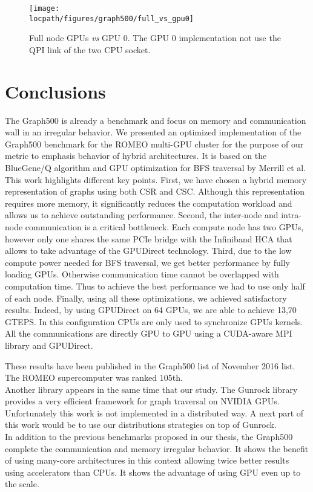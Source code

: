\begin{figure}[!t]
\centering
\texttt{[image: \\locpath/figures/graph500/full\_vs\_gpu0]}
\caption[]{Full node GPUs \textit{vs} GPU 0. The GPU 0 implementation not use the QPI link of the two CPU socket.}
\label{fig:full_vs_gpu0}
\end{figure}

\section{Conclusions}

The Graph500 is already a benchmark and focus on memory and communication wall in an irregular behavior.
We presented an optimized implementation of the Graph500 benchmark for the ROMEO  multi-GPU cluster for the purpose of our metric to emphasis behavior of hybrid architectures.
It is based on the BlueGene/Q algorithm and GPU optimization for BFS traversal by Merrill et al. 
This work highlights different key points.
First, we have chosen a hybrid memory representation of graphs using both CSR and CSC. 
Although this representation requires more memory, it significantly reduces  the computation workload and allows us to achieve outstanding performance.
Second, the inter-node and intra-node communication is a critical bottleneck. 
Each compute node has two GPUs, however only one shares the same PCIe bridge with the Infiniband HCA that allows to take advantage of the GPUDirect technology.
Third, due to the low compute power needed for BFS traversal, we get better performance by fully loading GPUs.
Otherwise communication time cannot be overlapped with computation time. 
Thus to achieve the best performance we had to use only half of each node.
Finally, using all these optimizations, we achieved satisfactory results. 
Indeed, by using GPUDirect on 64 GPUs,  we are able to achieve 13,70 GTEPS. 
In this configuration CPUs are only used to synchronize GPUs kernels. 
All the communications are directly GPU to GPU using a CUDA-aware MPI library and GPUDirect.

These results have been published in the Graph500 list of November 2016 list. 
The ROMEO supercomputer was ranked 105th.\\ 

Another library appears in the same time that our study. 
The Gunrock library\cite{wang2015gunrock} provides a very efficient framework for graph traversal on NVIDIA GPUs. 
Unfortunately this work is not implemented in a distributed way. 
A next part of this work would be to use our distributions strategies on top of Gunrock.\\

In addition to the previous benchmarks proposed in our thesis, the Graph500 complete the communication and memory irregular behavior. 
It shows the benefit of using many-core architectures in this context allowing twice better results using accelerators than CPUs.
It shows the advantage of using GPU even up to the scale. 
 